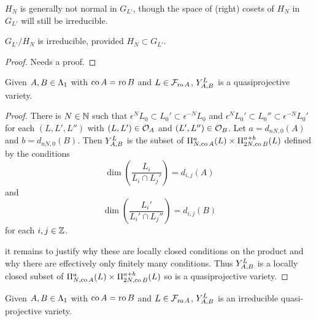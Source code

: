 \documentclass[a4paper, 11pt]{report}
\begin{document}
$H_N$ is generally not normal in $G_{L'}$, though the space of (right) cosets of $H_N$ in $G_{L'}$ will still be irreducible.

\begin{lemma}
$G_{L'}/H_N$ is irreducible, provided $H_N\subset G_{L'}$.
\end{lemma}

{\color{blue}
\begin{proof}
Needs a proof.
\end{proof}
}

\begin{lemma}\label{lemma:y-prod-is-quasiprojective}
Given $A,B\in\matrices$ with $\co{A}=\ro{B}$ and $L\in\flags_{\ro{A}}$, $\yprod[L]{A,B}$ is a quasiprojective variety.
\end{lemma}

\begin{proof}
There is $N\in\naturals$ such that $\epsilon^N L_0\subset L_0'\subset\epsilon^{-N}L_0$ and $\epsilon^N L_0'\subset L_0''\subset\epsilon^{-N}L_0'$ for each $(L,L',L'')$ with $(L,L')\in\orbit{A}$ and $(L',L'')\in\orbit{B}$. Let $a=d_{nN,0}(A)$ and $b=d_{nN,0}(B)$. Then $\yprod[L]{A,B}$ is the subset of $\Pi_{N,\co{A}}^a(L)\times\Pi_{2N,\co{B}}^{a+b}(L)$ defined by the conditions
\begin{equation*}
\dim\left(\frac{L_i}{L_i\cap L_j'}\right) = d_{i,j}(A)
\end{equation*}
and
\begin{equation*}
\dim\left(\frac{L_i'}{L_i'\cap L_j''}\right) = d_{i,j}(B)
\end{equation*}
for each $i,j\in\integers$.

{\color{blue} it remains to justify why these are locally closed conditions on the product and why there are effectively only finitely many conditions.}
Thus $\yprod[L]{A,B}$ is a locally closed subset of $\Pi_{N,\co{A}}^a(L)\times\Pi_{2N,\co{B}}^{a+b}(L)$ so is a quasiprojective variety.
\end{proof}

\begin{proposition}\label{prop:irreducible-y-prod}
Given $A,B\in\matrices$ with $\co{A}=\ro{B}$ and $L\in\flags_{\ro{A}}$, $\yprod[L]{A,B}$ is an irreducible quasi-projective variety.
\end{proposition}
\end{document}
